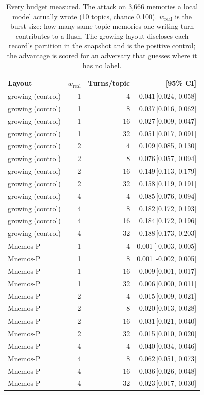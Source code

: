 \begin{table}[t]
\centering
\caption{Every budget measured. The attack on 3,666 memories a local model actually wrote (10 topics, chance 0.100). $w_{\mathrm{real}}$ is the burst size: how many same-topic memories one writing turn contributes to a flush. The growing layout discloses each record's partition in the snapshot and is the positive control; the advantage is scored for an adversary that guesses where it has no label.}
\label{tab:supp-e2}
\small
\setlength{\tabcolsep}{4pt}
\begin{tabular}{lrrr}
\toprule
Layout & $w_{\mathrm{real}}$ & Turns/topic & \advhist{} [95\% CI] \\
\midrule
growing (control) & 1 & 4 & 0.041\,[0.024, 0.058] \\
growing (control) & 1 & 8 & 0.037\,[0.016, 0.062] \\
growing (control) & 1 & 16 & 0.027\,[0.009, 0.047] \\
growing (control) & 1 & 32 & 0.051\,[0.017, 0.091] \\
growing (control) & 2 & 4 & 0.109\,[0.085, 0.130] \\
growing (control) & 2 & 8 & 0.076\,[0.057, 0.094] \\
growing (control) & 2 & 16 & 0.149\,[0.113, 0.179] \\
growing (control) & 2 & 32 & 0.158\,[0.119, 0.191] \\
growing (control) & 4 & 4 & 0.085\,[0.076, 0.094] \\
growing (control) & 4 & 8 & 0.182\,[0.172, 0.193] \\
growing (control) & 4 & 16 & 0.184\,[0.172, 0.196] \\
growing (control) & 4 & 32 & 0.188\,[0.173, 0.203] \\
Mnemos-P & 1 & 4 & 0.001\,[-0.003, 0.005] \\
Mnemos-P & 1 & 8 & 0.001\,[-0.002, 0.005] \\
Mnemos-P & 1 & 16 & 0.009\,[0.001, 0.017] \\
Mnemos-P & 1 & 32 & 0.006\,[0.000, 0.011] \\
Mnemos-P & 2 & 4 & 0.015\,[0.009, 0.021] \\
Mnemos-P & 2 & 8 & 0.020\,[0.013, 0.028] \\
Mnemos-P & 2 & 16 & 0.031\,[0.021, 0.040] \\
Mnemos-P & 2 & 32 & 0.015\,[0.010, 0.020] \\
Mnemos-P & 4 & 4 & 0.040\,[0.034, 0.046] \\
Mnemos-P & 4 & 8 & 0.062\,[0.051, 0.073] \\
Mnemos-P & 4 & 16 & 0.036\,[0.026, 0.048] \\
Mnemos-P & 4 & 32 & 0.023\,[0.017, 0.030] \\
\bottomrule
\end{tabular}
\end{table}
